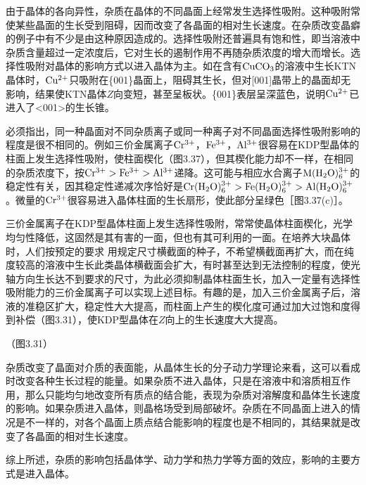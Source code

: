 由于晶体的各向异性，杂质在晶体的不同晶面上经常发生选择性吸附。这种吸附常使某些晶面的生长受到阻碍，因而改变了各晶面的相对生长速度。在杂质改变晶癖的例子中有不少是由这种原因造成的。选择性吸附还普遍具有饱和性，即当溶液中杂质含量超过一定浓度后，它对生长的遏制作用不再随杂质浓度的增大而增长。选择性吸附对晶体的影响方式以进入晶体为主。如在含有$\rm CuCO_3$的溶液中生长KTN晶体时，$\rm Cu^{2+}$只吸附在\{001\}晶面上，阻碍其生长，但对[001]晶带上的晶面却无影响，结果使KTN晶体$Z$向变短，甚至呈板状。\{001\}表层呈深蓝色，说明$\rm Cu^{2+}$已进入了<001>的生长锥。

必须指出，同一种晶面对不同杂质离子或同一种离子对不同晶面选择性吸附影响的程度是很不相同的。例如三价金属离子$\rm Cr^{3+}$，$\rm Fe^{3+}$，$\rm Al^{3+}$很容易在KDP型晶体的柱面上发生选择性吸附，使柱面楔化（图3.37），但其楔化能力却不一样，在相同的杂质浓度下，按$\rm Cr^{3+}>Fe^{3+}>Al^{3+}$递降。这可能与相应水合离子$\rm M(H_2O)_6^{3+}$的稳定性有关，因其稳定性递减次序恰好是$\rm Cr(H_2O)_6^{3+}>Fe(H_2O)_6^{3+}>Al(H_2O)_6^{3+}$。微量的$\rm Cr^{3+}$很容易进入晶体柱面的生长扇形，使此部分呈绿色［图3.37(c)］。

三价金属离子在KDP型晶体柱面上发生选择性吸附，常常使晶体柱面楔化，光学均匀性降低，这固然是其有害的一面，但也有其可利用的一面。在培养大块晶体时，人们按预定的要求 用规定尺寸横截面的种子，不希望横截面再扩大，而在纯度较高的溶液中生长此类晶体横截面会扩大，有时甚至达到无法控制的程度，使光轴方向生长达不到要求的尺寸，为此必须抑制晶体柱面生长，加入一定量有选择性吸附能力的三价金属离子可以实现上述目标。有趣的是，加入三价金属离子后，溶液的准稳区扩大，稳定性大大提高，而柱面上产生的楔化度可通过加大过饱和度得到补偿（图3.31），使KDP型晶体在$Z$向上的生长速度大大提高。

（图3.31）

杂质改变了晶面对介质的表面能，从晶体生长的分子动力学理论来看，这可以看成时改变各种生长过程的能量。如果杂质不进入晶体，只是在溶液中和溶质相互作用，那么只能均匀地改变所有质点的结合能，表现为杂质对溶解度和晶体生长速度的影响。如果杂质进入晶体，则晶格场受到局部破坏。杂质在不同晶面上进入的情况是不一样的，对各个晶面上质点结合能影响的程度也是不相同的，其结果就是改变了各晶面的相对生长速度。

综上所述，杂质的影响包括晶体学、动力学和热力学等方面的效应，影响的主要方式是进入晶体。


